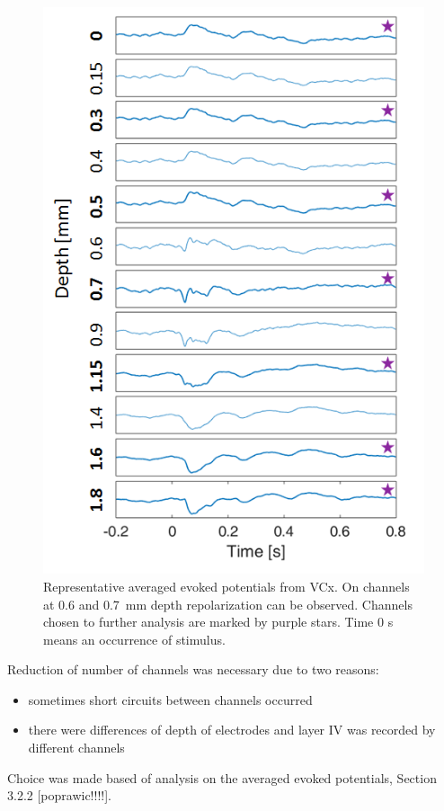 \documentclass{pracalicmgr}
\begin{document}
    \begin{figure}[H]
    	\begin{center}
    		\includegraphics[scale=0.75]{wybieranie_kanalow3.png}
    	\end{center}
    	\caption{ Representative averaged evoked potentials from VCx. On channels at 0.6 and 0.7~mm depth repolarization can be observed. Channels chosen to further analysis are marked by purple stars. Time 0 s means an occurrence of stimulus.}
    	\label{rys:kanaly}
    \end{figure} 
    
    Reduction of number of channels was necessary due to two reasons:
    \begin{itemize}
    	\item sometimes short circuits between channels occurred
    	\item there were differences of depth of electrodes and layer IV was recorded by different channels
    \end{itemize} 
    Choice was made based of analysis on the averaged evoked potentials, Section 3.2.2 [poprawic!!!!].
    
\end{document}
